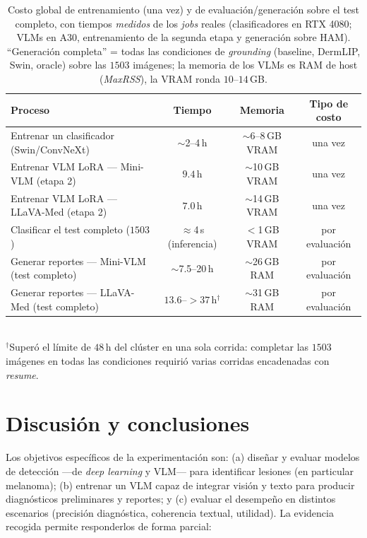 \documentclass[11pt, a4paper]{article}
\begin{document}
\begin{table}[H]
  \centering
  \caption{Costo global de entrenamiento (una vez) y de evaluación/generación sobre el test completo, con
  tiempos \emph{medidos} de los \emph{jobs} reales (clasificadores en RTX 4080; VLMs en A30, entrenamiento
  de la segunda etapa y generación sobre HAM). ``Generación completa'' = todas las condiciones de
  \emph{grounding} (baseline, DermLIP, Swin, oracle) sobre las $1503$ imágenes; la memoria de los VLMs es
  RAM de host (\emph{MaxRSS}), la VRAM ronda $10$--$14$\,GB.}
  \label{tab:costo_total}
  \small
  \begin{tabular}{lccc}
    \toprule
    \textbf{Proceso} & \textbf{Tiempo} & \textbf{Memoria} & \textbf{Tipo de costo} \\
    \midrule
    Entrenar un clasificador (Swin/ConvNeXt) & $\sim$2--4\,h & $\sim$6--8\,GB VRAM & una vez \\
    Entrenar VLM LoRA — Mini-VLM (etapa 2)   & $9.4$\,h & $\sim$10\,GB VRAM & una vez \\
    Entrenar VLM LoRA — LLaVA-Med (etapa 2)  & $7.0$\,h & $\sim$14\,GB VRAM & una vez \\
    Clasificar el test completo ($1503$)     & $\approx$4\,s (inferencia) & $<$1\,GB VRAM & por evaluación \\
    Generar reportes — Mini-VLM (test completo) & $\sim$7.5--20\,h & $\sim$26\,GB RAM & por evaluación \\
    Generar reportes — LLaVA-Med (test completo) & $13.6$--${>}37$\,h$^{\dagger}$ & $\sim$31\,GB RAM & por evaluación \\
    \bottomrule
  \end{tabular}
  \\[2pt]
  {\footnotesize $^{\dagger}$Superó el límite de $48$\,h del clúster en una sola corrida: completar las
  $1503$ imágenes en todas las condiciones requirió varias corridas encadenadas con \emph{resume}.}
\end{table}

\section{Discusión y conclusiones}
\label{sec:conclusion}
Los objetivos específicos de la experimentación son: (a) diseñar y evaluar modelos de detección —de \emph{deep
learning} y VLM— para identificar lesiones (en particular melanoma); (b) entrenar un VLM capaz de
integrar visión y texto para producir diagnósticos preliminares y reportes; y (c) evaluar el desempeño
en distintos escenarios (precisión diagnóstica, coherencia textual, utilidad). La evidencia recogida
permite responderlos de forma parcial:
\end{document}
